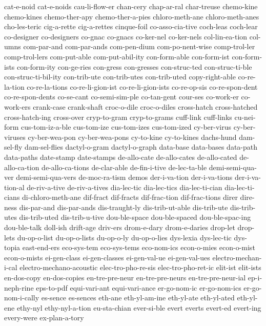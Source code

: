 {cat-e-noid
cat-e-noids
cau-li-flow-er
chan-cery
chap-ar-ral
char-treuse
chemo-kine
chemo-kines
chemo-ther-apy
chemo-ther-a-pies
chloro-meth-ane
chloro-meth-anes
cho-les-teric
cig-a-rette
cig-a-rettes
cinque-foil
co-asso-cia-tive
coch-leas
coch-lear
co-designer
co-designers
co-gnac
co-gnacs
co-ker-nel
co-ker-nels
col-lin-ea-tion
col-umns
com-par-and
com-par-ands
com-pen-dium
com-po-nent-wise
comp-trol-ler
comp-trol-lers
com-put-able
com-put-abil-ity
con-form-able
con-form-ist
con-form-ists
con-form-ity
con-ge-ries
con-gress
con-gresses
con-struc-ted
con-struc-ti-ble
con-struc-ti-bil-ity
con-trib-ute
con-trib-utes
con-trib-uted
copy-right-able
co-re-la-tion
co-re-la-tions
co-re-li-gion-ist
co-re-li-gion-ists
co-re-op-sis
co-re-spon-dent
co-re-spon-dents
co-se-cant
co-semi-sim-ple
co-tan-gent
cour-ses
co-work-er
co-work-ers
crank-case
crank-shaft
croc-o-dile
croc-o-diles
cross-hatch
cross-hatched
cross-hatch-ing
cross-over
cryp-to-gram
cryp-to-grams
cuff-link
cuff-links
cu-nei-form
cus-tom-iz-a-ble
cus-tom-ize
cus-tom-izes
cus-tom-ized
cy-ber-virus
cy-ber-viruses
cy-ber-wea-pon
cy-ber-wea-pons
cy-to-kine
cy-to-kines
dachs-hund
dam-sel-fly
dam-sel-flies
dactyl-o-gram
dactyl-o-graph
data-base
data-bases
data-path
data-paths
date-stamp
date-stamps
de-allo-cate
de-allo-cates
de-allo-cated
de-allo-ca-tion
de-allo-ca-tions
de-clar-able
de-fin-i-tive
de-lec-ta-ble
demi-semi-qua-ver
demi-semi-qua-vers
de-moc-ra-tism
demos
der-i-va-tion
der-i-va-tions
der-i-va-tion-al
de-riv-a-tive
de-riv-a-tives
dia-lec-tic
dia-lec-tics
dia-lec-ti-cian
dia-lec-ti-cians
di-chloro-meth-ane
dif-fract
dif-fracts
dif-frac-tion
dif-frac-tions
direr
dire-ness
dis-par-and
dis-par-ands
dis-traught-ly
dis-trib-ut-able
dis-trib-ute
dis-trib-utes
dis-trib-uted
dis-trib-u-tive
dou-ble-space
dou-ble-spaced
dou-ble-spac-ing
dou-ble-talk
doll-ish
drift-age
driv-ers
drom-e-dary
drom-e-daries
drop-let
drop-lets
du-op-o-list
du-op-o-lists
du-op-o-ly
du-op-o-lies
dys-lexia
dys-lec-tic
dys-topia
east-end-ers
eco-sys-tem
eco-sys-tems
eco-nom-ics
econ-o-mies
econ-o-mist
econ-o-mists
ei-gen-class
ei-gen-classes
ei-gen-val-ue
ei-gen-val-ues
electro-mechan-i-cal
electro-mechano-acoustic
elec-tro-pho-re-sis
elec-tro-pho-ret-ic
elit-ist
elit-ists
en-dos-copy
en-dos-copies
en-tre-pre-neur
en-tre-pre-neurs
en-tre-pre-neur-ial
ep-i-neph-rine
eps-to-pdf
equi-vari-ant
equi-vari-ance
er-go-nom-ic
er-go-nom-ics
er-go-nom-i-cally
es-sence
es-sences
eth-ane
eth-yl-am-ine
eth-yl-ate
eth-yl-ated
eth-yl-ene
ethy-nyl
ethy-nyl-a-tion
eu-sta-chian
ever-si-ble
evert
everts
evert-ed
evert-ing
every-were
ex-plan-a-tory
}
